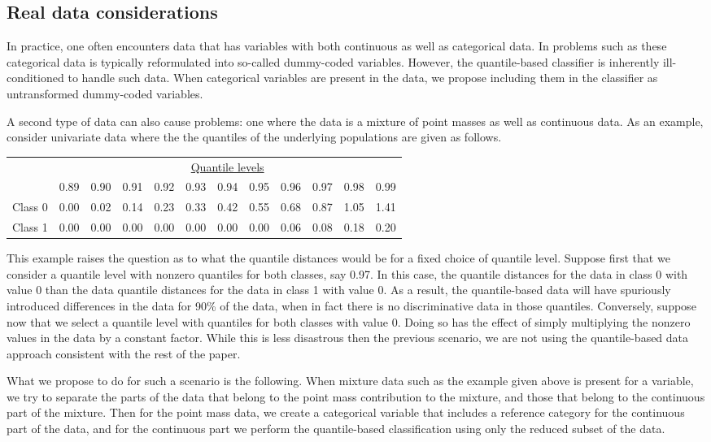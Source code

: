 \documentclass{article}
\begin{document}
\subsection{Real data considerations}

In practice, one often encounters data that has variables with both continuous
as well as categorical data.  In problems such as these categorical data is
typically reformulated into so-called dummy-coded variables.  However, the
quantile-based classifier is inherently ill-conditioned to handle such data.
When categorical variables are present in the data, we propose including them in
the classifier as untransformed dummy-coded variables.

A second type of data can also cause problems:  one where the data is a mixture
of point masses as well as continuous data.  As an example, consider univariate
data where the the quantiles of the underlying populations are given as follows.
\begin{center}
  \begin{tabular}{lrrrrrrrrrrr}
    \toprule
    & \multicolumn{11}{c}{\underline{Quantile levels}} \\
    & 0.89 & 0.90 & 0.91 & 0.92 & 0.93 & 0.94 & 0.95 & 0.96 & 0.97 & 0.98 & 0.99 \\
    \midrule
    Class 0 & 0.00 & 0.02 & 0.14 & 0.23 & 0.33 & 0.42 & 0.55 & 0.68 & 0.87 & 1.05 & 1.41 \\
    Class 1 & 0.00 & 0.00 & 0.00 & 0.00 & 0.00 & 0.00 & 0.00 & 0.06 & 0.08 & 0.18 & 0.20 \\
    \bottomrule
  \end{tabular}
\end{center}
This example raises the question as to what the quantile distances would be for
a fixed choice of quantile level.  Suppose first that we consider a quantile
level with nonzero quantiles for both classes, say 0.97.  In this case, the
quantile distances for the data in class 0 with value 0 than the data quantile
distances for the data in class 1 with value 0.  As a result, the quantile-based
data will have spuriously introduced differences in the data for 90\% of the
data, when in fact there is no discriminative data in those quantiles.
Conversely, suppose now that we select a quantile level with quantiles for both
classes with value 0.  Doing so has the effect of simply multiplying the nonzero
values in the data by a constant factor.  While this is less disastrous then the
previous scenario, we are not using the quantile-based data approach consistent
with the rest of the paper.

What we propose to do for such a scenario is the following.  When mixture data
such as the example given above is present for a variable, we try to separate
the parts of the data that belong to the point mass contribution to the mixture,
and those that belong to the continuous part of the mixture.  Then for the point
mass data, we create a categorical variable that includes a reference category
for the continuous part of the data, and for the continuous part we perform the
quantile-based classification using only the reduced subset of the data.
\end{document}
